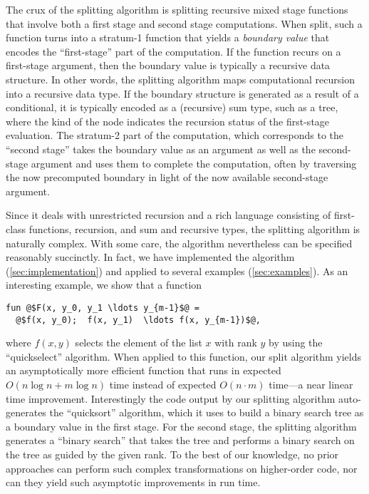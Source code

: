 The crux of the splitting algorithm is splitting recursive mixed stage
functions that involve both a first stage and second stage
computations.  When split, such a function turns into a stratum-1
function that yields a {\em boundary value} that encodes the
``first-stage'' part of the computation.  If the function recurs on a
first-stage argument, then the boundary value is typically a recursive
data structure.  In other words, the splitting algorithm maps
computational recursion into a recursive data type. If the boundary
structure is generated as a result of a conditional, it is typically
encoded as a (recursive) sum type, such as a tree, where the kind of
the node indicates the recursion status of the first-stage evaluation.
The stratum-2 part of the computation, which corresponds to the
``second stage'' takes the boundary value as an argument as well as
the second-stage argument and uses them to complete the computation,
often by traversing the now precomputed boundary in light of the now
available second-stage argument.

Since it deals with unrestricted recursion and a rich language
consisting of first-class functions, recursion, and sum and recursive
types, the splitting algorithm is naturally complex. With some care,
the algorithm nevertheless can be specified reasonably succinctly.  In
fact, we have implemented the algorithm (\ref{sec:implementation}) and
applied to several examples (\ref{sec:examples}).  As an interesting
example, we show that a function 

\begin{lstlisting}
fun @$F(x, y_0, y_1 \ldots y_{m-1}$@ = 
  @$f(x, y_0);  f(x, y_1)  \ldots f(x, y_{m-1})$@,
\end{lstlisting}
where $f(x,y)$ selects the element of the list $x$ with rank $y$ by
using the ``quickselect'' algorithm.  When applied to this function,
our split algorithm yields an asymptotically more efficient function
that runs in expected $O(n\log{n} + m\log{n})$ time instead of
expected $O(n \cdot m)$ time---a near linear time improvement.
Interestingly the code output by our splitting algorithm
auto-generates the ``quicksort'' algorithm, which it uses to build a
binary search tree as a boundary value in the first stage.  For the
second stage, the splitting algorithm generates a ``binary search''
that takes the tree and performs a binary search on the tree as guided
by the given rank.  To the best of our knowledge, no prior approaches
can perform such complex transformations on higher-order code, nor can
they yield such asymptotic improvements in run time.


